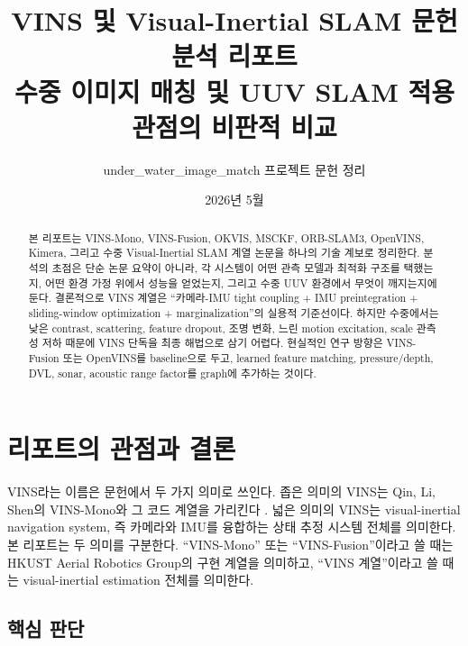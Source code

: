 \documentclass[11pt,a4paper]{article}
\title{\textbf{VINS 및 Visual-Inertial SLAM 문헌 분석 리포트}\\
\large 수중 이미지 매칭 및 UUV SLAM 적용 관점의 비판적 비교}
\author{under\_water\_image\_match 프로젝트 문헌 정리}
\date{2026년 5월}
\begin{document}
\maketitle

\begin{abstract}
본 리포트는 VINS-Mono, VINS-Fusion, OKVIS, MSCKF, ORB-SLAM3, OpenVINS, Kimera, 그리고 수중 Visual-Inertial SLAM 계열 논문을 하나의 기술 계보로 정리한다.
분석의 초점은 단순 논문 요약이 아니라, 각 시스템이 어떤 관측 모델과 최적화 구조를 택했는지, 어떤 환경 가정 위에서 성능을 얻었는지, 그리고 수중 UUV 환경에서 무엇이 깨지는지에 둔다.
결론적으로 VINS 계열은 ``카메라-IMU tight coupling + IMU preintegration + sliding-window optimization + marginalization''의 실용적 기준선이다.
하지만 수중에서는 낮은 contrast, scattering, feature dropout, 조명 변화, 느린 motion excitation, scale 관측성 저하 때문에 VINS 단독을 최종 해법으로 삼기 어렵다.
현실적인 연구 방향은 VINS-Fusion 또는 OpenVINS를 baseline으로 두고, learned feature matching, pressure/depth, DVL, sonar, acoustic range factor를 graph에 추가하는 것이다.
\end{abstract}

\tableofcontents
\clearpage

\section{리포트의 관점과 결론}

VINS라는 이름은 문헌에서 두 가지 의미로 쓰인다.
좁은 의미의 VINS는 Qin, Li, Shen의 VINS-Mono와 그 코드 계열을 가리킨다 \cite{qin2018vinsmono}.
넓은 의미의 VINS는 visual-inertial navigation system, 즉 카메라와 IMU를 융합하는 상태 추정 시스템 전체를 의미한다.
본 리포트는 두 의미를 구분한다.
``VINS-Mono'' 또는 ``VINS-Fusion''이라고 쓸 때는 HKUST Aerial Robotics Group의 구현 계열을 의미하고, ``VINS 계열''이라고 쓸 때는 visual-inertial estimation 전체를 의미한다.

\subsection{핵심 판단}
\end{document}
